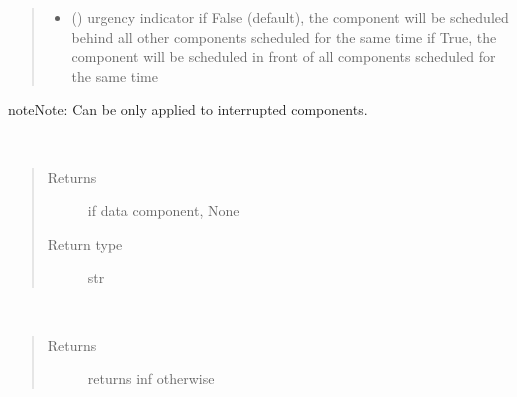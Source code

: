 \documentclass[letterpaper,10pt,english]{sphinxmanual}
\begin{document}
\begin{fulllineitems}
\begin{fulllineitems}
\begin{quote}
\begin{description}
\begin{itemize}
\item {} 
 () \textendash{} urgency indicator 
if False (default), the component will be scheduled
behind all other components scheduled
for the same time 
if True, the component will be scheduled
in front of all components scheduled
for the same time

\end{itemize}

\end{description}\end{quote}

\begin{sphinxadmonition}{note}{Note:}
Can be only applied to interrupted components. 
\end{sphinxadmonition}

\end{fulllineitems}


\begin{fulllineitems}
\label{\detokenize{Reference:salabim.Component.running_process}}~\begin{quote}\begin{description}
\item[{Returns}] \leavevmode
{} \textendash{} if data component, None

\item[{Return type}] \leavevmode
str

\end{description}\end{quote}

\end{fulllineitems}


\begin{fulllineitems}
\label{\detokenize{Reference:salabim.Component.scheduled_time}}~\begin{quote}\begin{description}
\item[{Returns}] \leavevmode
{} \textendash{} returns inf otherwise


\end{description}
\end{quote}
\end{fulllineitems}
\end{fulllineitems}
\end{document}
